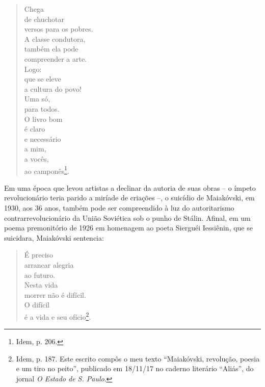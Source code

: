 \begin{verse}
Chega\\
\hspace{40pt}de chuchotar\\
\hspace{100pt}versos para os pobres.\\
A classe condutora,\\
\hspace{83pt}também ela pode\\
compreender a arte.\\[5pt]
Logo:\\
\hspace{15pt}que se eleve\\
\hspace{60pt}a cultura do povo!\\
Uma só,\\
\hspace{30pt}para todos.\\
O livro bom\\
\hspace{60pt}é claro\\
\hspace{100pt}e necessário\\
a mim,\\
\hspace{55pt}a vocês,\\
\hspace{110pt}ao camponês\footnote{Idem, p. 206.}.
\end{verse}

Em uma época que levou artistas a declinar da autoria de suas obras -- o
ímpeto revolucionário teria parido a miríade de criações --, o suicídio
de Maiakóvski, em 1930, aos 36 anos, também pode ser compreendido à luz
do autoritarismo contrarrevolucionário da União Soviética sob o punho de
Stálin. Afinal, em um poema premonitório de 1926 em homenagem ao poeta
Sierguéi Iessiênin, que se suicidara, Maiakóvski sentencia:

\begin{verse}
É preciso\\
\hspace{45pt}arrancar alegria\\
\hspace{120pt}ao futuro.\\
Nesta vida\\
\hspace{55pt}morrer não é difícil.\\
O difícil\\
\hspace{55pt}é a vida e seu ofício\footnote{Idem, p. 187. Este escrito compôs o meu
  texto ``Maiakóvski, revolução, poesia e um tiro no peito'', publicado
  em 18/11/17 no caderno literário ``Aliás'', do jornal \emph{O Estado
  de S. Paulo}.}.
\end{verse}

